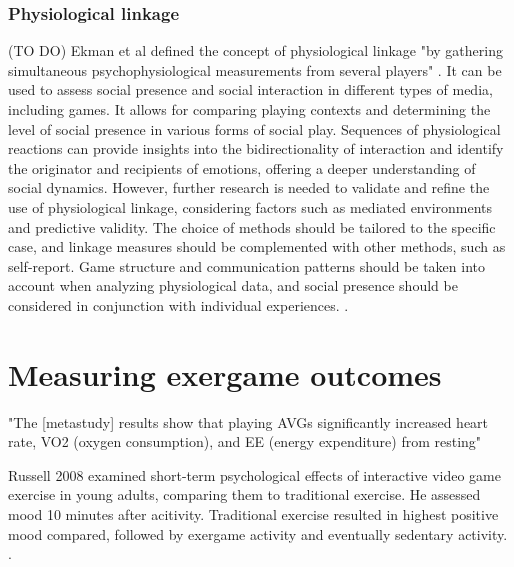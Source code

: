 \subsection{Physiological linkage} (TO DO)
Ekman et al defined the concept of physiological linkage "by gathering simultaneous psychophysiological measurements from several players" \cite{ekman2012social}. It can be used to assess social presence and social interaction in different types of media, including games. It allows for comparing playing contexts and determining the level of social presence in various forms of social play. Sequences of physiological reactions can provide insights into the bidirectionality of interaction and identify the originator and recipients of emotions, offering a deeper understanding of social dynamics. However, further research is needed to validate and refine the use of physiological linkage, considering factors such as mediated environments and predictive validity. The choice of methods should be tailored to the specific case, and linkage measures should be complemented with other methods, such as self-report. Game structure and communication patterns should be taken into account when analyzing physiological data, and social presence should be considered in conjunction with individual experiences. .



















\chapter{Measuring exergame outcomes}



"The [metastudy] results show that playing AVGs significantly increased heart rate, VO2 (oxygen consumption), and EE (energy expenditure) from resting" \cite{peng2011playing}

Russell 2008 examined short-term psychological effects of interactive video game exercise in young adults, comparing them to traditional exercise. He assessed mood 10 minutes after acitivity. Traditional exercise resulted in highest positive mood compared, followed by exergame activity and eventually sedentary activity. \cite{russell2008short}.

